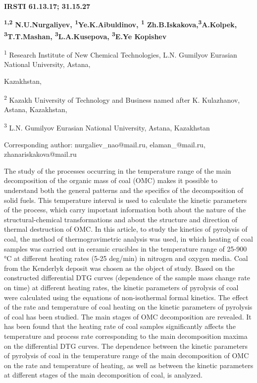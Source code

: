 \newpage
{\bfseries IRSTI 61.13.17; 31.15.27}


\begin{center}
{\bfseries \textsuperscript{1,2} N.U.Nurgaliyev, \textsuperscript{1}Ye.K.Aibuldinov, \textsuperscript{1} Zh.B.Iskakova,\textsuperscript{3}A.Kolpek, \textsuperscript{3}T.T.Mashan, \textsuperscript{3}L.A.Kusepova, \textsuperscript{3}E.Ye Kopishev}

\textsuperscript{1} Research Institute of New Chemical Technologies,
L.N. Gumilyov Eurasian National University, Astana,

Kazakhstan,

\textsuperscript{2} Kazakh University of Technology and Business named
after K. Kulazhanov, Astana, Kazakhstan,

\textsuperscript{3} L.N. Gumilyov Eurasian National University, Astana,
Kazakhstan

Corresponding author: nurgaliev\_nao@mail.ru, elaman\_@mail.ru,
zhanariskakova@mail.ru
\end{center}

The study of the processes occurring in the temperature range of the
main decomposition of the organic mass of coal (OMC) makes it possible
to understand both the general patterns and the specifics of the
decomposition of solid fuels. This temperature interval is used to
calculate the kinetic parameters of the process, which carry important
information both about the nature of the structural-chemical
transformations and about the structure and direction of thermal
destruction of OMC. In this article, to study the kinetics of pyrolysis
of coal, the method of thermogravimetric analysis was used, in which
heating of coal samples was carried out in ceramic crucibles in the
temperature range of 25-900 °C at different heating rates (5-25 deg/min)
in nitrogen and oxygen media. Coal from the Kenderlyk deposit was chosen
as the object of study. Based on the constructed differential DTG curves
(dependence of the sample mass change rate on time) at different heating
rates, the kinetic parameters of pyrolysis of coal were calculated using
the equations of non-isothermal formal kinetics. The effect of the rate
and temperature of coal heating on the kinetic parameters of pyrolysis
of coal has been studied. The main stages of OMC decomposition are
revealed. It has been found that the heating rate of coal samples
significantly affects the temperature and process rate corresponding to
the main decomposition maxima on the differential DTG curves. The
dependence between the kinetic parameters of pyrolysis of coal in the
temperature range of the main decomposition of OMC on the rate and
temperature of heating, as well as between the kinetic parameters at
different stages of the main decomposition of coal, is analyzed.


